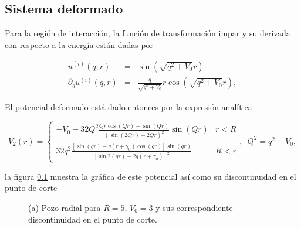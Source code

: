 \subsection{Sistema deformado}


Para la región de interacción, la función de transformación impar y su derivada con respecto a la energía están dadas por

\begin{eqnarray*}
u^{(i)}(q,r) &=& \sin(\sqrt{q^2 + V_0} r)
\\
\partial_q u^{(i)}(q,r) &=& \frac{q}{\sqrt{q^2 + V_0}} r \cos(\sqrt{q^2 + V_0} r),
\end{eqnarray*}

El potencial deformado está dado entonces por la expresión analítica

\begin{equation*}
V_2 (r) =
\begin{cases}
-V_0 -  32 Q^2 \frac{Q r \cos(Q r) - \sin(Q r)}{(\sin(2 Q r) - 2 Q r)^2} \sin(Q r) & r < R
\\
32q^2\frac{[\sin{(qr)}-q(r+\gamma_0)\cos{(qr)}]\sin{(qr)}}{[\sin{2(qr)}-2q(r+\gamma_0)]^2} & R < r
\end{cases}
, \,\,\, Q^2 = q^2 + V_0 ,
\end{equation*}

la figura \ref{} muestra la gráfica de este potencial así como su discontinuidad en el punto de corte 

\begin{figure}
	\centering
	\hfill%
	\caption{\label{TRPR-Figure} (a) Pozo radial para $R=5$, $V_0=3$ y sus correspondiente discontinuidad en el punto de corte.}
\end{figure}
 
